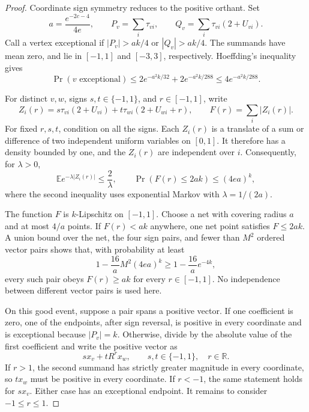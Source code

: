 \documentclass[11pt]{article}
\begin{document}
\begin{proof}
Coordinate sign symmetry reduces to the positive orthant. Set
\[
 a=\frac{e^{-2c-4}}{4e},\qquad
 P_v=\sum_i\tau_{vi},\qquad
 Q_v=\sum_i\tau_{vi}(2+U_{vi}).
\]
Call a vertex exceptional if $|P_v|>ak/4$ or $|Q_v|>ak/4$.
The summands have mean zero, and lie in $[-1,1]$ and $[-3,3]$,
respectively. Hoeffding's inequality gives
\[
 \Pr(v\text{ exceptional})
 \leq2e^{-a^2k/32}+2e^{-a^2k/288}
 \leq4e^{-a^2k/288}.
\]

For distinct $v,w$, signs $s,t\in\{-1,1\}$, and $r\in[-1,1]$,
write
\[
 Z_i(r)=s\tau_{vi}(2+U_{vi})+
 t\tau_{wi}(2+U_{wi}+r),\qquad
 F(r)=\sum_i|Z_i(r)|.
\]
For fixed $r,s,t$, condition on all the signs. Each $Z_i(r)$
is a translate of a sum or difference of two independent uniform
variables on $[0,1]$. It therefore has a density bounded by one,
and the $Z_i(r)$ are independent over $i$. Consequently, for
$\lambda>0$,
\[
 \mathbb E e^{-\lambda|Z_i(r)|}\leq\frac{2}{\lambda},
 \qquad
 \Pr(F(r)\leq2ak)\leq(4ea)^k,
\]
where the second inequality uses exponential Markov with
$\lambda=1/(2a)$.

The function $F$ is $k$-Lipschitz on $[-1,1]$. Choose a net
with covering radius $a$ and at most $4/a$ points. If
$F(r)<ak$ anywhere, one net point satisfies $F\leq2ak$.
A union bound over the net, the four sign pairs, and fewer than
$M^2$ ordered vector pairs shows that, with probability at least
\[
 1-\frac{16}{a}M^2(4ea)^k
 \geq1-\frac{16}{a}e^{-4k},
\]
every such pair obeys $F(r)\geq ak$ for every $r\in[-1,1]$.
No independence between different vector pairs is used here.

On this good event, suppose a pair spans a positive vector. If one
coefficient is zero, one of the endpoints, after sign reversal,
is positive in every coordinate and is exceptional because
$|P_v|=k$. Otherwise, divide by the absolute value of the first
coefficient and write the positive vector as
\[
 s x_v+t R^r x_w,
 \qquad s,t\in\{-1,1\},\quad r\in\mathbb R.
\]
If $r>1$, the second summand has strictly greater magnitude in
every coordinate, so $t x_w$ must be positive in every coordinate.
If $r<-1$, the same statement holds for $s x_v$. Either case
has an exceptional endpoint. It remains to consider $-1\leq r\leq1$.


\end{proof}
\end{document}

